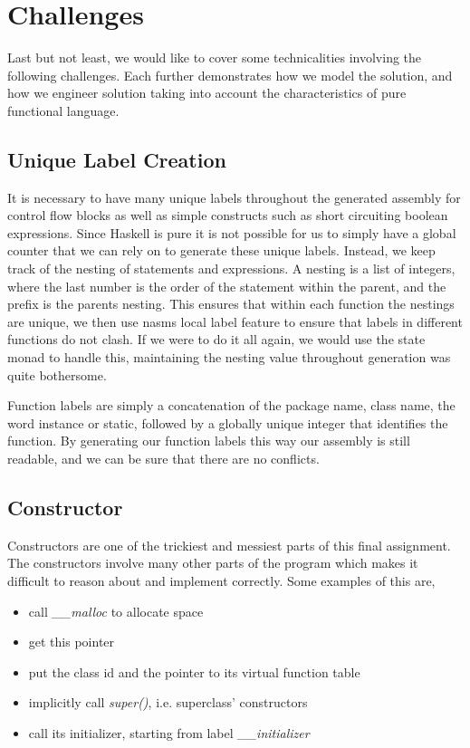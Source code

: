 \documentclass[12pt,letterpaper]{article}
\begin{document}
\section{Challenges}
Last but not least, we would like to cover some technicalities involving the following challenges. Each further demonstrates how we model the solution, and how we engineer solution taking into account the characteristics of pure functional language.

\subsection{Unique Label Creation}
It is necessary to have many unique labels throughout the generated assembly for control flow blocks as well as simple constructs such as short circuiting boolean expressions.
Since Haskell is pure it is not possible for us to simply have a global counter that we can rely on to generate these unique labels.
Instead, we keep track of the nesting of statements and expressions.
A nesting is a list of integers, where the last number is the order of the statement within the parent, and the prefix is the parents nesting.
This ensures that within each function the nestings are unique, we then use nasms local label feature to ensure that labels in different functions do not clash.
If we were to do it all again, we would use the state monad to handle this, maintaining the nesting value throughout generation was quite bothersome.

Function labels are simply a concatenation of the package name, class name, the word instance or static, followed by a globally unique integer that identifies the function.
By generating our function labels this way our assembly is still readable, and we can be sure that there are no conflicts.

\subsection{Constructor}
Constructors are one of the trickiest and messiest parts of this final assignment.
The constructors involve many other parts of the program which makes it difficult to reason about and implement correctly.
Some examples of this are,
\begin{itemize}
\item call \emph{\_\_malloc} to allocate space
\item get this pointer
\item put the class id and the pointer to its virtual function table
\item implicitly call \emph{super()}, i.e. superclass' constructors
\item call its initializer, starting from label \emph{\_\_initializer}
\end{itemize}
\end{document}
